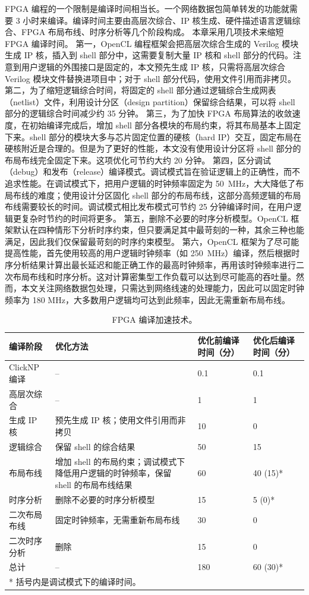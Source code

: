 FPGA 编程的一个限制是编译时间相当长。一个网络数据包简单转发的功能就需要 3 小时来编译。编译时间主要由高层次综合、IP 核生成、硬件描述语言逻辑综合、FPGA 布局布线、时序分析等几个阶段构成。
本章采用几项技术来缩短 FPGA 编译时间。
第一，OpenCL 编程框架会把高层次综合生成的 Verilog 模块生成 IP 核，插入到 shell 部分中，这需要复制大量 IP 核和 shell 部分的代码。注意到用户逻辑的外围接口是固定的，本文预先生成 IP 核，只需将高层次综合 Verilog 模块文件替换进项目中；对于 shell 部分代码，使用文件引用而非拷贝。
第二，为了缩短逻辑综合时间，将固定的 shell 部分通过逻辑综合生成网表（netlist）文件，利用设计分区（design partition）保留综合结果，可以将 shell 部分的逻辑综合时间减少约 35 分钟。
第三，为了加快 FPGA 布局算法的收敛速度，在初始编译完成后，增加 shell 部分各模块的布局约束，将其布局基本上固定下来。shell 部分的模块大多与芯片固定位置的硬核（hard IP）交互，固定布局在硬核附近是合理的。但是为了更好的性能，本文没有使用设计分区将 shell 部分的布局布线完全固定下来。这项优化可节约大约 20 分钟。
第四，区分调试（debug）和发布（release）编译模式。调试模式旨在验证逻辑上的正确性，而不追求性能。在调试模式下，把用户逻辑的时钟频率固定为 50~MHz，大大降低了布局布线的难度；使用设计分区固化 shell 部分的布局布线，这部分高频逻辑的布局布线需要较长的时间。调试模式相比发布模式可节约 25 分钟编译时间，在用户逻辑更复杂时节约的时间将更多。
第五，删除不必要的时序分析模型。OpenCL 框架默认在四种情形下分析时序约束，但只要满足其中最苛刻的一种，其余三种也能满足，因此我们仅保留最苛刻的时序约束模型。
第六，OpenCL 框架为了尽可能提高性能，首先使用较高的用户逻辑时钟频率（如 250~MHz）编译，然后根据时序分析结果计算出最长延迟和能正确工作的最高时钟频率，再用该时钟频率进行二次布局布线和时序分析。这对计算密集型工作负载可以达到尽可能高的吞吐量。然而，本文关注网络数据包处理，只需达到网络线速的处理能力，因此可以固定时钟频率为 180 MHz，大多数用户逻辑均可达到此频率，因此无需重新布局布线。

\begin{table}[htbp]
	\centering
	\caption{FPGA 编译加速技术。}
	\label{clicknp:tab:fpga-compilation}
	\small
	\begin{tabular}{l|p{}|p{}|p{}}
		\toprule
		编译阶段 & 优化方法 & 优化前编译时间（分） & 优化后编译时间（分） \\
		\midrule
		ClickNP 编译 & -- & 0.1 & 0.1 \\
		高层次综合 & -- & 1 & 1 \\
		生成 IP 核 & 预先生成 IP 核；使用文件引用而非拷贝 & 10 & 0 \\
		逻辑综合 & 保留 shell 的综合结果 & 50 & 15 \\
		布局布线 & 增加 shell 的布局约束；调试模式下降低用户逻辑的时钟频率，保留 shell 的布局布线结果 & 60 & 40 (15)* \\
		时序分析 & 删除不必要的时序分析模型 & 15 & 5 (0)* \\
		二次布局布线 & 固定时钟频率，无需重新布局布线 & 30 & 0 \\
		二次时序分析 & 删除 & 15 & 0 \\
		\midrule
		总计 & -- & 180 & 60 (30)* \\
		\bottomrule
		\multicolumn{4}{l}{* 括号内是调试模式下的编译时间。}
	\end{tabular}
\end{table}

